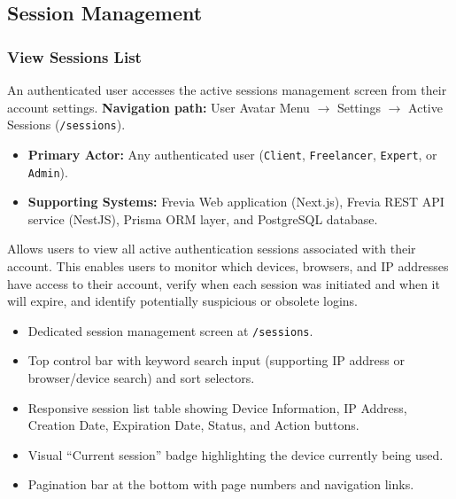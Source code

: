 \subsection{Session Management}

\subsubsection{ View Sessions List}

An authenticated user accesses the active sessions management screen from their account settings.\newline
\textbf{Navigation path:} User Avatar Menu $\rightarrow$ Settings $\rightarrow$ Active Sessions (\texttt{/sessions}).


\begin{itemize}[leftmargin=1.6em,topsep=3pt,itemsep=2pt,parsep=0pt,label=$\bullet$]
    \item \textbf{Primary Actor:} Any authenticated user (\texttt{Client}, \texttt{Freelancer}, \texttt{Expert}, or \texttt{Admin}).
    \item \textbf{Supporting Systems:} Frevia Web application (Next.js), Frevia REST API service (NestJS), Prisma ORM layer, and PostgreSQL database.
\end{itemize}

\noindent Allows users to view all active authentication sessions associated with their account. This enables users to monitor which devices, browsers, and IP addresses have access to their account, verify when each session was initiated and when it will expire, and identify potentially suspicious or obsolete logins.

\begin{itemize}[leftmargin=1.6em,topsep=3pt,itemsep=2pt,parsep=0pt,label=$\bullet$]
    \item Dedicated session management screen at \texttt{/sessions}.
    \item Top control bar with keyword search input (supporting IP address or browser/device search) and sort selectors.
    \item Responsive session list table showing Device Information, IP Address, Creation Date, Expiration Date, Status, and Action buttons.
    \item Visual ``Current session'' badge highlighting the device currently being used.
    \item Pagination bar at the bottom with page numbers and navigation links.
\end{itemize}

